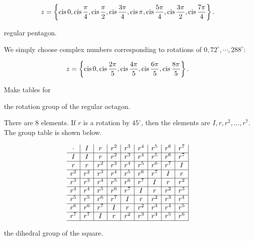 \documentclass[../key.tex]{subfiles}
\begin{document}
$$z = \left\{\operatorname{cis} 0, \operatorname{cis} \frac{\pi}{4}, \operatorname{cis} \frac{\pi}{2}, \operatorname{cis} \frac{3\pi}{4}, \operatorname{cis} \pi, \operatorname{cis} \frac{5\pi}{4}, \operatorname{cis} \frac{3\pi}{2}, \operatorname{cis} \frac{7\pi}{4} \right\}.$$

\begin{inner_problem}
\item regular pentagon.
\end{inner_problem}

We simply choose complex numbers corresponding to rotations of $0,72^\circ, \cdots,288^\circ$:

$$z= \left\{\operatorname{cis} 0, \operatorname{cis} \frac{2\pi}{5}, \operatorname{cis} \frac{4\pi}{5}, \operatorname{cis} \frac{6\pi}{5}, \operatorname{cis} \frac{8\pi}{5} \right\}.$$

\begin{outer_problem}
\item Make tables for
\end{outer_problem}

\begin{inner_problem}[start=1]
\item the rotation group of the regular octagon.
\end{inner_problem}

There are $8$ elements. If $r$ is a rotation by $45^\circ$, then the elements are $I, r, r^2, ..., r^7$. The group table is shown below.

$$\begin{array}{c|c|c|c|c|c|c|c|c|}
\cdot & I & r & r^2 & r^3 & r^4 & r^5 & r^6 & r^7 \\ \hline
I & I & r & r^2 & r^3 & r^4 & r^5 & r^6 & r^7 \\ \hline
r & r & r^2 & r^3 & r^4 & r^5 & r^6 & r^7 & I \\ \hline
r^2 & r^2 & r^3 & r^4 & r^5 & r^6 & r^7 & I & r \\ \hline
r^3 & r^3 & r^4 & r^5 & r^6 & r^7 & I & r & r^2 \\ \hline
r^4 & r^4 & r^5 & r^6 & r^7 & I & r & r^2 & r^3 \\ \hline
r^5 & r^5 & r^6 & r^7 & I & r & r^2 & r^3 & r^4 \\ \hline
r^6 & r^6 & r^7 & I & r & r^2 & r^3 & r^4 & r^5 \\ \hline
r^7 & r^7 & I & r & r^2 & r^3 & r^4 & r^5 & r^6 \\ \hline
\end{array}$$

\begin{inner_problem}
\item the dihedral group of the square.
\end{inner_problem}
\end{document}
